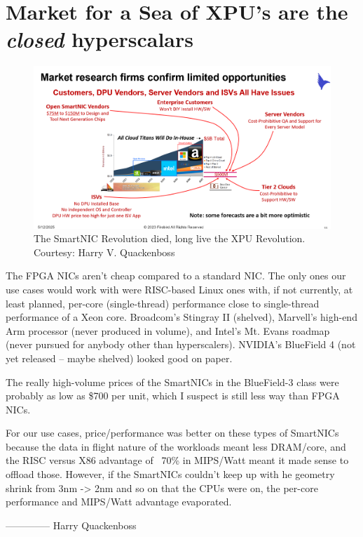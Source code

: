\section{Market for a Sea of XPU's are the \emph{closed} hyperscalars}

\begin{figure}
  \includegraphics[width=\linewidth]{../../FIGURES/XPU-market.png}
  \caption{The SmartNIC Revolution died, long live the XPU Revolution. Courtesy: Harry V. Quackenboss}
\end{figure}

 
The FPGA NICs aren’t cheap compared to a standard NIC.  The only ones our use cases would work with were RISC-based Linux ones with, if not currently, at least planned, per-core (single-thread) performance close to single-thread performance of a Xeon core. Broadcom’s Stingray II (shelved), Marvell’s high-end Arm processor (never produced in volume), and Intel’s Mt. Evans roadmap (never pursued for anybody other than hyperscalers).  NVIDIA’s BlueField 4 (not yet released – maybe shelved) looked good on paper.
 
The really high-volume prices of the SmartNICs in the BlueField-3 class were probably as low as \$700 per unit, which I suspect is still less way than FPGA NICs.
 
For our use cases, price/performance was better on these types of SmartNICs because the data in flight nature of the workloads meant less DRAM/core, and the RISC versus X86 advantage of ~70\% in MIPS/Watt meant it made sense to offload those. However, if the SmartNICs couldn’t keep up with he geometry shrink from 3nm -> 2nm and so on that the CPUs were on, the per-core performance and MIPS/Watt advantage evaporated.
 
 --------------
Harry Quackenboss


\bigskip
\newpage
 
